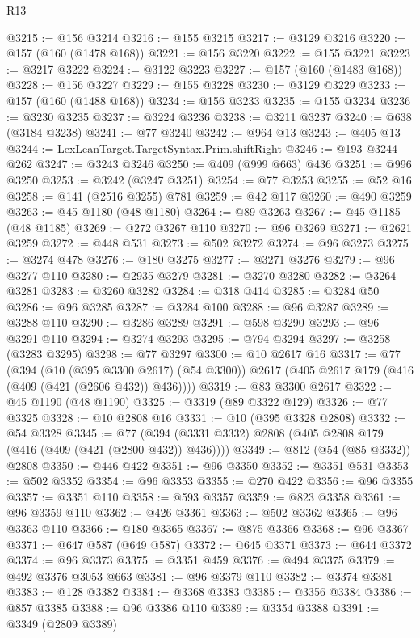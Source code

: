 \begin{lexlean}{R13}
\begin{coremodule}
@3215 := @156 @3214
@3216 := @155 @3215
@3217 := @3129 @3216
@3220 := @157 (@160 (@1478 @168))
@3221 := @156 @3220
@3222 := @155 @3221
@3223 := @3217 @3222
@3224 := @3122 @3223
@3227 := @157 (@160 (@1483 @168))
@3228 := @156 @3227
@3229 := @155 @3228
@3230 := @3129 @3229
@3233 := @157 (@160 (@1488 @168))
@3234 := @156 @3233
@3235 := @155 @3234
@3236 := @3230 @3235
@3237 := @3224 @3236
@3238 := @3211 @3237
@3240 := @638 (@3184 @3238)
@3241 := @77 @3240
@3242 := @964 @13
@3243 := @405 @13
@3244 := LexLeanTarget.TargetSyntax.Prim.shiftRight
@3246 := @193 @3244 @262
@3247 := @3243 @3246
@3250 := @409 (@999 @663) @436
@3251 := @996 @3250
@3253 := @3242 (@3247 @3251)
@3254 := @77 @3253
@3255 := @52 @16
@3258 := @141 (@2516 @3255) @781
@3259 := @42 @117
@3260 := @490 @3259
@3263 := @45 @1180 (@48 @1180)
@3264 := @89 @3263
@3267 := @45 @1185 (@48 @1185)
@3269 := @272 @3267 @110
@3270 := @96 @3269
@3271 := @2621 @3259
@3272 := @448 @531
@3273 := @502 @3272
@3274 := @96 @3273
@3275 := @3274 @478
@3276 := @180 @3275
@3277 := @3271 @3276
@3279 := @96 @3277 @110
@3280 := @2935 @3279
@3281 := @3270 @3280
@3282 := @3264 @3281
@3283 := @3260 @3282
@3284 := @318 @414
@3285 := @3284 @50
@3286 := @96 @3285
@3287 := @3284 @100
@3288 := @96 @3287
@3289 := @3288 @110
@3290 := @3286 @3289
@3291 := @598 @3290
@3293 := @96 @3291 @110
@3294 := @3274 @3293
@3295 := @794 @3294
@3297 := @3258 (@3283 @3295)
@3298 := @77 @3297
@3300 := @10 @2617 @16
@3317 := @77
    (@394
      (@10 (@395 @3300 @2617) (@54 @3300))
      @2617
      (@405 @2617 @179 (@416 (@409 (@421 (@2606 @432)) @436))))
@3319 := @83 @3300 @2617
@3322 := @45 @1190 (@48 @1190)
@3325 := @3319 (@89 @3322 @129)
@3326 := @77 @3325
@3328 := @10 @2808 @16
@3331 := @10 (@395 @3328 @2808)
@3332 := @54 @3328
@3345 := @77 (@394 (@3331 @3332) @2808 (@405 @2808 @179 (@416 (@409 (@421 (@2800 @432)) @436))))
@3349 := @812 (@54 (@85 @3332)) @2808
@3350 := @446 @422
@3351 := @96 @3350
@3352 := @3351 @531
@3353 := @502 @3352
@3354 := @96 @3353
@3355 := @270 @422
@3356 := @96 @3355
@3357 := @3351 @110
@3358 := @593 @3357
@3359 := @823 @3358
@3361 := @96 @3359 @110
@3362 := @426 @3361
@3363 := @502 @3362
@3365 := @96 @3363 @110
@3366 := @180 @3365
@3367 := @875 @3366
@3368 := @96 @3367
@3371 := @647 @587 (@649 @587)
@3372 := @645 @3371
@3373 := @644 @3372
@3374 := @96 @3373
@3375 := @3351 @459
@3376 := @494 @3375
@3379 := @492 @3376 @3053 @663
@3381 := @96 @3379 @110
@3382 := @3374 @3381
@3383 := @128 @3382
@3384 := @3368 @3383
@3385 := @3356 @3384
@3386 := @857 @3385
@3388 := @96 @3386 @110
@3389 := @3354 @3388
@3391 := @3349 (@2809 @3389)

\end{coremodule}
\end{lexlean}

